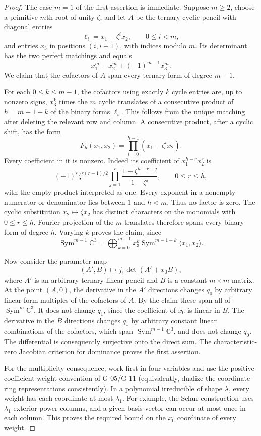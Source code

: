 \documentclass[11pt,a4paper]{article}
\theoremstyle{definition}\newtheorem{definition}{Definition}
\begin{document}
\begin{proof}
The case $m=1$ of the first assertion is immediate. Suppose
$m\geq2$, choose a primitive $m$th root of unity $\zeta$,
and let $A$ be the ternary cyclic pencil with diagonal
entries
\[
 \ell_i=x_1-\zeta^i x_2,\qquad 0\leq i<m,
\]
and entries $x_3$ in positions $(i,i+1)$, with indices
modulo $m$. Its determinant has the two perfect matchings
and equals
\[
 x_1^m-x_2^m+(-1)^{m-1}x_3^m.
\]
We claim that the cofactors of $A$ span every ternary form
of degree $m-1$.

For each $0\leq k\leq m-1$, the cofactors using exactly
$k$ cycle entries are, up to nonzero signs, $x_3^k$ times
the $m$ cyclic translates of a consecutive product of
$h=m-1-k$ of the binary forms $\ell_i$. This follows from
the unique matching after deleting the relevant row and
column. A consecutive product, after a cyclic shift,
has the form
\[
 F_h(x_1,x_2)=\prod_{i=0}^{h-1}(x_1-\zeta^i x_2).
\]
Every coefficient in it is nonzero. Indeed its coefficient
of $x_1^{h-r}x_2^r$ is
\[
 (-1)^r\zeta^{r(r-1)/2}
   \prod_{j=1}^r\frac{1-\zeta^{h-r+j}}{1-\zeta^j},
 \qquad 0\leq r\leq h,
\]
with the empty product interpreted as one. Every exponent
in a nonempty numerator or denominator lies between $1$
and $h<m$. Thus no factor is zero. The cyclic substitution
$x_2\mapsto\zeta x_2$ has distinct characters on the
monomials with $0\leq r\leq h$. Fourier projection of the
$m$ translates therefore spans every binary form of degree
$h$. Varying $k$ proves the claim, since
\[
 \operatorname{Sym}^{m-1}\mathbb C^3
 =\bigoplus_{k=0}^{m-1}x_3^k
        \operatorname{Sym}^{m-1-k}\langle x_1,x_2\rangle.
\]

Now consider the parameter map
\[
 (A',B)\longmapsto j_1\det(A'+x_0B),
\]
where $A'$ is an arbitrary ternary linear pencil and $B$
is a constant $m\times m$ matrix. At the point $(A,0)$,
the derivative in the $A'$ directions changes $q_0$ by
arbitrary linear-form multiples of the cofactors of $A$.
By the claim these span all of
$\operatorname{Sym}^m\mathbb C^3$. It does not change
$q_1$, since the coefficient of $x_0$ is linear in $B$.
The derivative in the $B$ directions changes $q_1$ by
arbitrary constant linear combinations of the cofactors,
which span $\operatorname{Sym}^{m-1}\mathbb C^3$, and
does not change $q_0$. The differential is consequently
surjective onto the direct sum. The characteristic-zero
Jacobian criterion for dominance proves the first assertion.

For the multiplicity consequence, work first in four
variables and use the positive coefficient weight convention
of G-05/G-11 (equivalently, dualize the coordinate-ring
representations consistently). In a polynomial irreducible
of shape $\lambda$, every weight has each coordinate at
most $\lambda_1$. For example, the Schur construction uses
$\lambda_1$ exterior-power columns, and a given basis vector
can occur at most once in each column. This proves the
required bound on the $x_0$ coordinate of every weight.


\end{proof}
\end{document}
